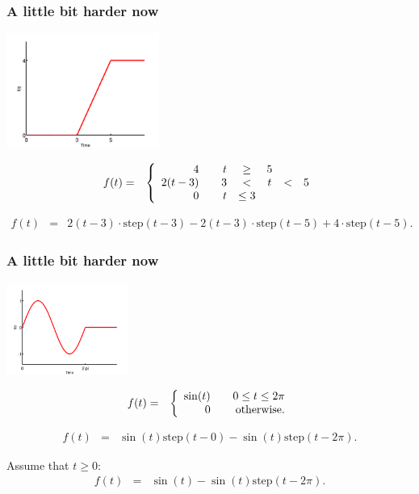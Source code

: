 \begin{frame}
  \frametitle{A little bit harder now}

  \centerline{\includegraphics[width=5cm]{img/stepEx4}}

  \begin{eqnarray*}
      f(t) & = & 
      \left\{
        \begin{array}{r@{\hspace{2em}}rcccl}
          4 & t & \geq & 5 \\
          2(t-3) & 3 & < & t & < & 5 \\
          0 & t & \leq 3 
        \end{array}
      \right.
  \end{eqnarray*}

  {
    \begin{eqnarray*}
      f(t) & = & 2(t-3)\cdot\mathrm{step}(t-3) -
      2(t-3)\cdot\mathrm{step}(t-5) + 4\cdot\mathrm{step}(t-5).
    \end{eqnarray*}
  }


\end{frame}


\begin{frame}
  \frametitle{A little bit harder now}

  \centerline{\includegraphics[width=4cm]{img/stepEx5}}

  \begin{eqnarray*}
      f(t) & = & 
      \left\{
        \begin{array}{r@{\hspace{2em}}r}
          \sin(t) & 0 \leq t \leq 2\pi \\
          0 &  \mathrm{otherwise}.
        \end{array}
      \right.
  \end{eqnarray*}

  {
    \begin{eqnarray*}
      f(t) & = & \sin(t)\mathrm{step}(t-0) - \sin(t)\mathrm{step}(t-2\pi).
    \end{eqnarray*}
  }


  {
    Assume that $t\geq 0$:
    \begin{eqnarray*}
      f(t) & = & \sin(t) - \sin(t)\mathrm{step}(t-2\pi).
    \end{eqnarray*}
  }


\end{frame}



